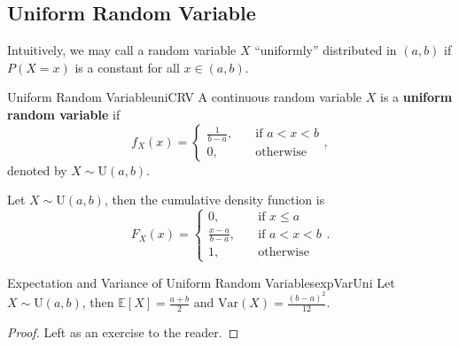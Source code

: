 \documentclass[math]{amznotes}
\theoremstyle{remark}
\newcommand{\0}{\mathbf{0}}
\newcommand{\1}{\mathbf{1}}
\begin{document}
\subsection{Uniform Random Variable}
Intuitively, we may call a random variable $X$ ``uniformly'' distributed in $(a, b)$ if $P(X = x)$ is a constant for all $x \in (a, b)$.
\begin{dfnbox}{Uniform Random Variable}{uniCRV}
    A continuous random variable $X$ is a {\color{red} \textbf{uniform random variable}} if
    \begin{equation*}
        f_X(x) = \begin{cases}
            \frac{1}{b - a}, & \quad\textrm{if } a < x < b \\
            0, & \quad\textrm{otherwise}
        \end{cases},
    \end{equation*}
    denoted by $X \sim \mathrm{U}(a, b)$.
\end{dfnbox}
Let $X \sim \mathrm{U}(a, b)$, then the cumulative density function is
\begin{equation*}
    F_X(x) = \begin{cases}
        0, & \quad\textrm{if } x \leq a \\
        \frac{x - a}{b - a}, & \quad\textrm{if } a < x < b \\
        1, & \quad\textrm{otherwise}
    \end{cases}.
\end{equation*}
\begin{probox}{Expectation and Variance of Uniform Random Variables}{expVarUni}
    Let $X \sim \mathrm{U}(a, b)$, then $\mathbb{E}[X] = \frac{a + b}{2}$ and $\mathrm{Var}(X) = \frac{(b - a)^2}{12}$.
    \tcblower
    \begin{proof}
        Left as an exercise to the reader.
    \end{proof}
\end{probox}
\end{document}
